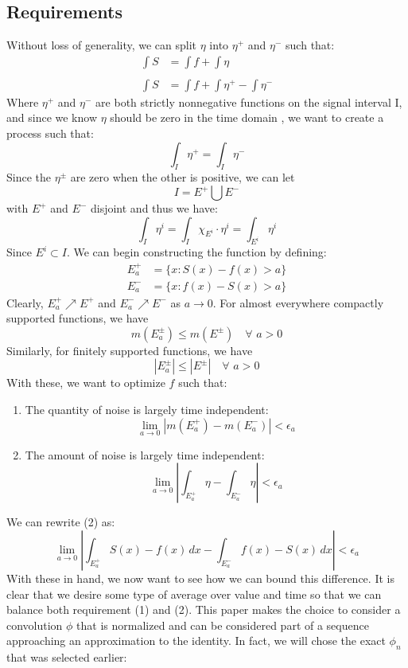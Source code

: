 \documentclass[11pt]{amsart}
\theoremstyle{definition}
\theoremstyle{remark}
\begin{document}
\subsection{Requirements}
Without loss of generality, we can split $\eta$ into $\eta^+$ and $\eta^-$ such that:
\begin{align*}
\int S&=\int f+\int \eta\\\\
\int S&=\int f+\int \eta^+-\int \eta^-
\end{align*}
Where $\eta^+$ and $\eta^-$ are both strictly nonnegative functions on the signal interval I, and since we know $\eta$ should be zero in the time domain \cite{saito_naoki_simultaneous_1994}, we want to create a process such that:$$\int_I\eta^+=\int_I\eta^-$$
Since the $\eta^\pm$ are zero when the other is positive, we can let $$I=E^+\bigcup E^-$$ with $E^+$ and $E^-$ disjoint and thus we have:
$$\int_I\eta^i =\int_I\chi_{E^i}\cdot\eta^i= \int_{E^i}\eta^i$$
Since $E^i\subset I$. We can begin constructing the function by defining:
\begin{align*}
E_a^+ &= \{x: S(x)-f(x)>a\}\\
E_a^- &= \{x: f(x)-S(x)>a\}
\end{align*}
\vfill
Clearly, $E_a^+\nearrow E^+$ and $E_a^- \nearrow E^-$ as $a\to 0$. For almost everywhere compactly supported functions, we have $$m(E^\pm_a)\le m(E^\pm)\quad \forall\,\, a>0$$Similarly, for finitely supported functions, we have $$|E^\pm_a|\le |E^\pm|\quad \forall\,\, a>0$$
\vfill
With these, we want to optimize $f$ such that:
\begin{enumerate}
	\item The quantity of noise is largely time independent: 
	$$\lim_{a\to 0} \left\lvert m(E_a^+) - m(E_a^-) \right\rvert < \epsilon_a$$
	\item The amount of noise is largely time independent:
	$$\lim_{a\to 0}\left\lvert \int_{E_a^+} \eta - \int_{E_a^-} \eta\right\rvert<\epsilon_a$$
\end{enumerate}
We can rewrite (2) as:
$$\lim_{a\to 0}\left\lvert \int_{E_a^+} S(x)-f(x)\,dx - \int_{E_a^-} f(x)-S(x)\,dx\right\rvert<\epsilon_a$$
With these in hand, we now want to see how we can bound this difference. It is clear that we desire some type of average over value and time so that we can balance both requirement (1) and (2). This paper makes the choice to consider a convolution $\phi$ that is normalized and can be considered part of a sequence approaching an approximation to the identity. In fact, we will chose the exact $\phi_n$ that was selected earlier:
\end{document}
